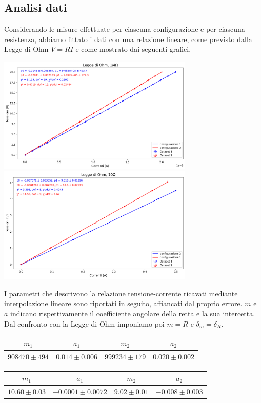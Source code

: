 \documentclass[a4paper]{article}
\begin{document}
\subsection{Analisi dati}
Considerando le misure effettuate per ciascuna configurazione e per ciascuna resistenza, abbiamo fittato i dati con una relazione lineare, come previsto dalla Legge di Ohm \( V = RI \) e come mostrato dai seguenti grafici.

\begin{center}
\includegraphics[width=0.7\textwidth]{grafici/ohm_resistenza_alta.png}
\includegraphics[width=0.7\textwidth]{grafici/ohm_resistenza_bassa.png}
\end{center}

I parametri che descrivono la relazione tensione-corrente ricavati mediante interpolazione lineare sono riportati in seguito, affiancati dal proprio errore. \( \mathit{m} \) e \( \mathit{a} \) indicano rispettivamente il coefficiente angolare della retta e la sua intercetta. Dal confronto con la Legge di Ohm imponiamo poi \( m = R \) e \( \delta_{m} = \delta_{R} \).

\begin{center}
\begin{tabular}{|c|c|c|c|}
\hline
$m_1$ & $a_1$ & $m_2$ & $a_2$ \\
\hline
$908470 \pm 494$ & $0.014 \pm 0.006$ & $999234 \pm 179$ & $0.020 \pm 0.002$\\
\hline
\end{tabular}
\end{center}
\begin{center}
\begin{tabular}{|c|c|c|c|}
\hline
$m_1$ & $a_1$ & $m_2$ & $a_2$ \\
\hline
$10.60 \pm 0.03$ & $-0.0001 \pm 0.0072$ & $9.02 \pm 0.01$ & $-0.008 \pm 0.003$\\
\hline
\end{tabular}
\end{center}
\end{document}
